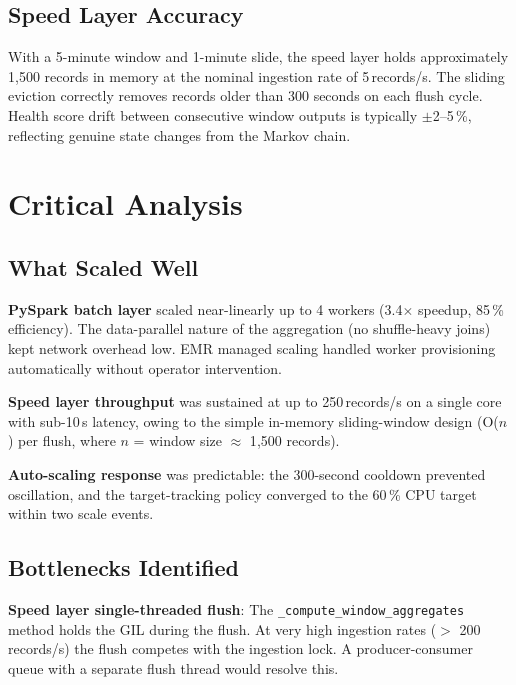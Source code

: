 \documentclass[conference]{IEEEtran}
\begin{document}
\subsection{Speed Layer Accuracy}

With a 5-minute window and 1-minute slide, the speed layer holds approximately
1{,}500 records in memory at the nominal ingestion rate of 5\,records/s. The
sliding eviction correctly removes records older than 300 seconds on each flush
cycle. Health score drift between consecutive window outputs is typically
$\pm$2--5\,\%, reflecting genuine state changes from the Markov chain.

\section{Critical Analysis}

\subsection{What Scaled Well}

\textbf{PySpark batch layer} scaled near-linearly up to 4 workers (3.4$\times$
speedup, 85\,\% efficiency). The data-parallel nature of the aggregation (no
shuffle-heavy joins) kept network overhead low. EMR managed scaling handled
worker provisioning automatically without operator intervention.

\textbf{Speed layer throughput} was sustained at up to 250\,records/s on a
single core with sub-10\,s latency, owing to the simple in-memory sliding-window
design (O($n$) per flush, where $n$ = window size $\approx$ 1{,}500 records).

\textbf{Auto-scaling response} was predictable: the 300-second cooldown prevented
oscillation, and the target-tracking policy converged to the 60\,\% CPU target
within two scale events.

\subsection{Bottlenecks Identified}

\textbf{Speed layer single-threaded flush}: The \texttt{\_compute\_window\_aggregates}
method holds the GIL during the flush. At very high ingestion rates
($>$ 200\,records/s) the flush competes with the ingestion lock. A producer-consumer
queue with a separate flush thread would resolve this.
\end{document}
